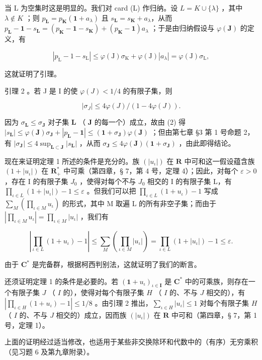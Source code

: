 当 L 为空集时这是明显的。我们对 card (L) 作归纳。设 \(L = K \cup \{\lambda\}\) ，其中 \(\lambda \notin K\) ；则 \(p_{\mathbf{L}} = p_{\mathbf{K}}(\mathbf{1} + a_{\lambda})\) 且 \(s_{\mathbf{L}} = s_{\mathbf{K}} + a_{\lambda}\)，从而 \(p_{\mathbf{L}} - \mathbf{1} - s_{\mathbf{L}} = (p_{\mathbf{K}} - \mathbf{1} - s_{\mathbf{K}}) + (p_{\mathbf{K}} - \mathbf{1})a_{\lambda}\) ；于是由归纳假设与 \(\varphi(\mathbf{J})\) 的定义，有

\[
\left| p _ {\mathrm{L}} - \mathrm{1} - s _ {\mathrm{L}} \right| \leqslant \varphi (\mathrm{J}) \sigma_ {\mathrm{K}} + \varphi (\mathrm{J}) \left| a _ {\lambda} \right| = \varphi (\mathrm{J}) \sigma_ {\mathrm{L}},
\]

这就证明了引理。

引理 2 。若 J 是 I 的使 \(\varphi(J) < 1/4\) 的有限子集，则

\[
\left| \sigma_ {J} \right| \leqslant 4 \varphi (J) / (1 - 4 \varphi (J)).
\]

因为 \(\sigma_{\mathbf{L}} \leqslant \sigma_{\mathbf{J}}\) 对子集 \(\mathbf{L}\) （ \(\mathbf{J}\) 的每一个）成立，故由 (2) 得 \(|s_{\mathbf{L}}| \leqslant \varphi(\mathbf{J})\sigma_{\mathbf{J}} + |p_{\mathbf{L}} - \mathbf{1}| \leqslant (\mathbf{1} + \sigma_{\mathbf{J}})\varphi(\mathbf{J})\) ；但由第七章 §3 第 1 号命题 2，有 \(|\sigma_{\mathbf{J}}| \leqslant 4\sup_{\mathbf{L} \subset \mathbf{J}} |s_{\mathbf{L}}|\) ，从而 \(\sigma_{\mathbf{J}} \leqslant 4\varphi(\mathbf{J})(\mathbf{1} + \sigma_{\mathbf{J}})\) ，由此即得结论。

现在来证明定理 1 所述的条件是充分的。族 \((|u_{\iota}|)\) 在 \(\mathbf{R}\) 中可和这一假设蕴含族 \((\mathrm{1} + |u_{\iota}|)\) 在 \(\mathbf{R}_{+}^{*}\) 中可乘（第四章，§ 7，第 4 号，定理 4）；因此，对每个 \(\varepsilon > 0\) ，存在 I 的有限子集 \(J_{0}\) ，使得对每个不与 \(J_{0}\) 相交的 I 的有限子集 L，有 \(\prod_{\iota \in L} (\mathrm{1} + |u_{\iota}|) - \mathrm{1} \leqslant \varepsilon\) 。但我们可以把 \(\prod_{\iota \in L} (\mathrm{1} + u_{\iota}) - \mathrm{1}\) 写成 \(\sum_{M} \left( \prod_{\iota \in M} u_{\iota} \right)\) 的形式，其中 M 取遍 L 的所有非空子集；而由于 \(\left| \prod_{\iota \in M} u_{\iota} \right| = \prod_{\iota \in M} |u_{\iota}|\) ，我们有

\[
\left| \prod_ {\iota \in L} (1 + u _ {\iota}) - 1 \right| \leqslant \sum_ {M} \left(\prod_ {\iota \in M} | u _ {\iota} |\right) = \prod_ {\iota \in L} (1 + | u _ {\iota} |) - 1 \leqslant \varepsilon .
\]

由于 \(\mathbf{C}^*\) 是完备群，根据柯西判别法，这就证明了我们的断言。

还须证明定理 1 的条件是必要的。若 \((\mathbf{1} + u_{\iota})_{\iota\in \mathbf{I}}\) 是 \(\mathbf{C}^*\) 中的可乘族，则存在一个有限子集 \(J\) （ \(I\) 的），使得对每个有限子集 \(H\) （ \(I\) 的、不与 \(J\) 相交的），有 \(\left|\prod_{\iota\in H}(1 + u_{\iota}) - 1\right| \leqslant 1/8\) 。由引理 2 推出，\(\sum_{\iota\in H}|u_{\iota}| \leqslant 1\) 对每个有限子集 \(H\) （ \(I\) 的、不与 \(J\) 相交的）成立，因而族 \((|u_{\iota}|)\) 在 \(\mathbf{R}\) 中可和（第四章，§ 7，第 1 号，定理 1）。

上面的证明经过适当修改，也适用于某些非交换除环和代数中的（有序）无穷乘积（见习题 6 及第九章附录）。

